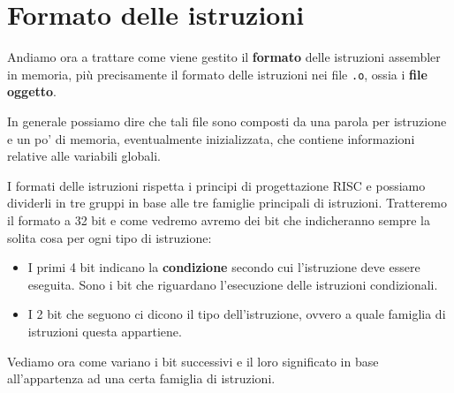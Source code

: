 \section{Formato delle istruzioni}\label{sz: formato}
Andiamo ora a trattare come viene gestito il \textbf{formato} delle istruzioni assembler in memoria,
più precisamente il formato delle istruzioni nei file \verb|.o|, ossia i \textbf{file oggetto}.

In generale possiamo dire che tali file sono composti da una parola per istruzione e un po' di
memoria, eventualmente inizializzata, che contiene informazioni relative alle variabili globali.

I formati delle istruzioni rispetta i principi di progettazione RISC e possiamo dividerli in tre
gruppi in base alle tre famiglie principali di istruzioni. Tratteremo il formato a 32 bit e come
vedremo avremo dei bit che indicheranno sempre la solita cosa per ogni tipo di istruzione:
\begin{itemize}
	\item I primi 4 bit indicano la \textbf{condizione} secondo cui l'istruzione deve essere
	      eseguita. Sono i bit che riguardano l'esecuzione delle istruzioni condizionali.
	\item I 2 bit che seguono ci dicono il tipo dell'istruzione, ovvero a quale famiglia di
	      istruzioni questa appartiene.
\end{itemize}
Vediamo ora come variano i bit successivi e il loro significato in base all'appartenza ad una certa
famiglia di istruzioni.
